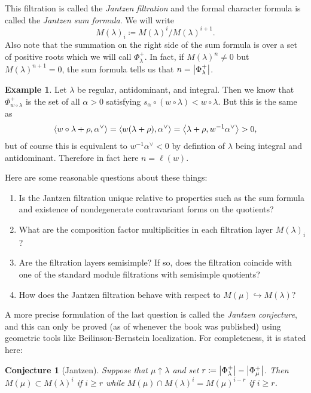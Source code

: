 \documentclass[leqno, openany]{memoir}
\newtheorem{conj}[thm]{Conjecture}
\theoremstyle{definition}
\newtheorem{exm}[thm]{Example}
\theoremstyle{remark}
\theoremstyle{plain}
\theoremstyle{definition}
\theoremstyle{remark}
\begin{document}
This filtration is called the \textit{Jantzen filtration} and the formal character formula is called the \textit{Jantzen sum formula}. We will write
\[ M(\lambda)_{i} \coloneqq M(\lambda)^{i} / M(\lambda)^{i+1}. \]
Also note that the summation on the right side of the sum formula is over a set of positive roots which we will call $\Phi_{\lambda}^+$. In fact, if $M(\lambda)^n \neq 0$ but $M(\lambda)^{n+1} = 0$, the sum formula tells us that $n = \abs{\Phi_{\lambda}^+}$.

\begin{exm}
  Let $\lambda$ be regular, antidominant, and integral. Then we know that $\Phi_{w \circ \lambda}^+$ is the set of all $\alpha > 0$ satisfying $s_{\alpha} \circ (w \circ \lambda) < w \circ \lambda$. But this is the same as
  \[ \ev{w \circ \lambda + \rho, \alpha^{\vee}} = \ev{w(\lambda + \rho), \alpha^{\vee}} = \ev{\lambda + \rho, w^{-1} \alpha^{\vee}} > 0, \]
  but of course this is equivalent to $w^{-1} \alpha^{\vee} < 0$ by defintion of $\lambda$ being integral and antidominant. Therefore in fact here $n = \ell(w)$.
\end{exm}

Here are some reasonable questions about these things:
\begin{enumerate}
  \item Is the Jantzen filtration unique relative to properties such as the sum formula and existence of nondegenerate contravariant forms on the quotients?
  \item What are the composition factor multiplicities in each filtration layer $M(\lambda)_i$?
  \item Are the filtration layers semisimple? If so, does the filtration coincide with one of the standard module filtrations with semisimple quotients?
  \item How does the Jantzen filtration behave with respect to $M(\mu) \hookrightarrow M(\lambda)$?
\end{enumerate}

A more precise formulation of the last question is called the \textit{Jantzen conjecture}, and this can only be proved (as of whenever the book was published) using geometric tools like Beilinson-Bernstein localization. For completeness, it is stated here:

\begin{conj}[Jantzen]
  Suppose that $\mu \uparrow \lambda$ and set $r \coloneqq \abs{\Phi_{\lambda}^+} - \abs{\Phi_{\mu}^+}$. Then $M(\mu) \subset M(\lambda)^i$ if $i \geq r$ while $M(\mu) \cap M(\lambda)^i = M(\mu)^{i-r}$ if $i \geq r$.
\end{conj}
\end{document}
